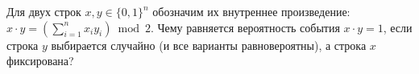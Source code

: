 Для двух строк $x, y \in \{0, 1\}^n$ обозначим их внутреннее произведение: $x \cdot y = \left( \sum\limits_{i = 1}^n x_i y_i
\right) \bmod 2$. Чему равняется вероятность события $x \cdot y = 1$, если строка $y$ выбирается случайно (и все варианты
равновероятны), а строка $x$ фиксирована?